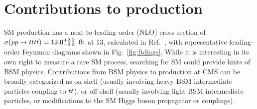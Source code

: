 
\FloatBarrier

\section{Contributions to \tttt production}

SM \tttt production has a next-to-leading-order (NLO) cross section of 
$\sigma(pp\to t\bar{t}t\bar{t}) = 12.0^{+2.2}_{-2.5}~\text{\,fb}$
at 13\TeV, calculated in Ref.~\cite{THEORY:Frederix2017wme},
with representative leading-order Feynman diagrams shown in
Fig.~\ref{fig:ftdiags}.
While it is interesting in its own right to measure a rare SM process,
searching for SM \tttt could provide hints of BSM physics.
Contributions from BSM physics to \tttt production at CMS can be 
broadly categorized as on-shell (usually involving heavy BSM intermediate particles coupling
to $t\bar{t}$), or off-shell (usually involving light BSM intermediate particles, or
modifications to the SM Higgs boson propagator or couplings).

